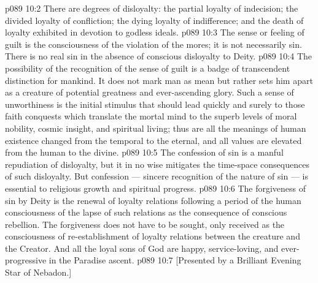 \vs p089 10:2 \pc {} There are degrees of disloyalty: the partial loyalty of indecision; the divided loyalty of confliction; the dying loyalty of indifference; and the death of loyalty exhibited in devotion to godless ideals.
\vs p089 10:3 \pc The sense or feeling of guilt is the consciousness of the violation of the mores; it is not necessarily sin. There is no real sin in the absence of conscious disloyalty to Deity.
\vs p089 10:4 The possibility of the recognition of the sense of guilt is a badge of transcendent distinction for mankind. It does not mark man as mean but rather sets him apart as a creature of potential greatness and ever\hyp{}ascending glory. Such a sense of unworthiness is the initial stimulus that should lead quickly and surely to those faith conquests which translate the mortal mind to the superb levels of moral nobility, cosmic insight, and spiritual living; thus are all the meanings of human existence changed from the temporal to the eternal, and all values are elevated from the human to the divine.
\vs p089 10:5 The confession of sin is a manful repudiation of disloyalty, but it in no wise mitigates the time\hyp{}space consequences of such disloyalty. But confession --- sincere recognition of the nature of sin --- is essential to religious growth and spiritual progress.
\vs p089 10:6 The forgiveness of sin by Deity is the renewal of loyalty relations following a period of the human consciousness of the lapse of such relations as the consequence of conscious rebellion. The forgiveness does not have to be sought, only received as the consciousness of re\hyp{}establishment of loyalty relations between the creature and the Creator. And all the loyal sons of God are happy, service\hyp{}loving, and ever\hyp{}progressive in the Paradise ascent.
\vsetoff
\vs p089 10:7 [Presented by a Brilliant Evening Star of Nebadon.]
\quizlink
